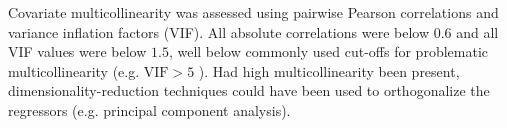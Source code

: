 \documentclass{article}
\begin{document}
Covariate multicollinearity was assessed using pairwise Pearson correlations and variance inflation factors (VIF). All absolute correlations were below $0.6$ and all VIF values were below $1.5$, well below commonly used cut-offs for problematic multicollinearity (e.g. $\text{VIF} > 5$ \citep[Sec. 6.4.1]{sheather2009a}).
Had high multicollinearity been present, dimensionality-reduction techniques could have been used to orthogonalize the regressors (e.g. principal component analysis).








\end{document}
